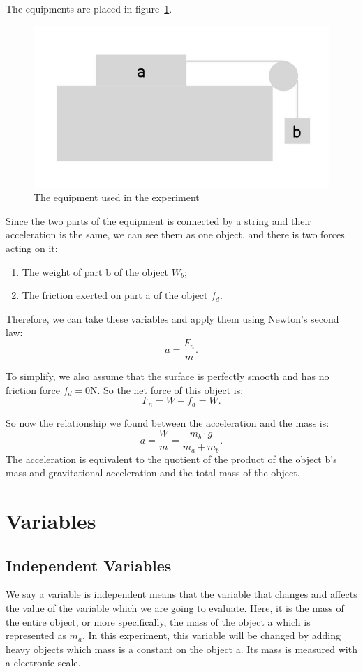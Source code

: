 \documentclass{article}
\begin{document}
The equipments are placed in figure~\ref{fig:equip}.
\begin{figure}
  \centering
  \includegraphics[width=.78\hsize]{equip.jpeg}
  \caption{The equipment used in the experiment}
  \label{fig:equip}
\end{figure}

Since the two parts of the equipment is connected by a string and their acceleration is the same,
we can see them as one object, and there is two forces acting on it:
\begin{enumerate}
  \item The weight of part b of the object $W_b$;
  \item The friction exerted on part a of the object $f_d$.
\end{enumerate}
Therefore, we can take these variables and apply them using Newton's second law:
\[
  a = \frac{F_n}{m}.
\]

To simplify, we also assume that the surface is perfectly smooth and has no friction force $f_d = 0 \text{N}$.
So the net force of this object is:
\[
  F_n = W + f_d = W.
\]

So now the relationship we found between the acceleration and the mass is:
\[
  a = \frac{W}{m} = \frac{m_b \cdot g}{m_a + m_b}.
\]
The acceleration is equivalent to the quotient of the product of the object b's mass and gravitational acceleration and the total mass of the object.

\section{Variables}

\subsection{Independent Variables}

We say a variable is independent means that the variable that changes and affects the value of the variable which we are going to evaluate.
Here, it is the mass of the entire object, or more specifically, the mass of the object a which is represented as $m_a$.
In this experiment, this variable will be changed by adding heavy objects which mass is a constant on the object a.
Its mass is measured with a electronic scale.
\end{document}
